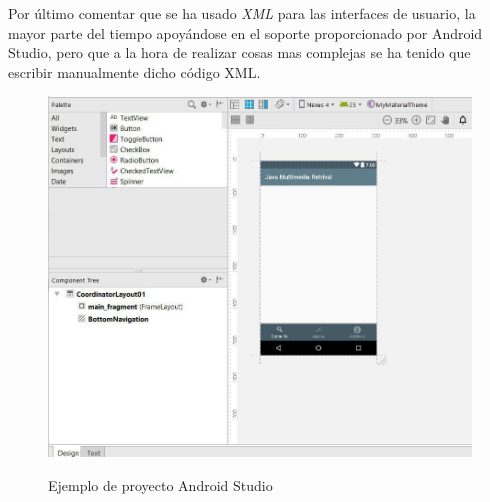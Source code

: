 Por último comentar que se ha usado \textit{XML} para las interfaces de usuario, la mayor parte del tiempo apoyándose en el soporte proporcionado por Android Studio, pero que a la hora de realizar cosas mas complejas se ha tenido que escribir manualmente dicho código XML.

\begin{figure}[H] %
\centering
\includegraphics[scale=0.6]{imagenes/interfaz-android-studio.jpg}  %
\label{interfaz-android-studio.jpg}
\caption{Ejemplo de proyecto Android Studio}
\end{figure}

